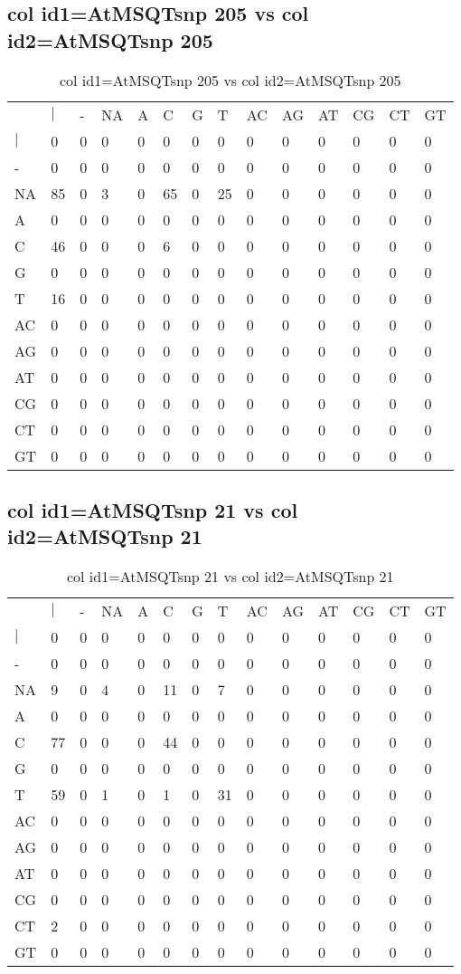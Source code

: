 \subsection{col id1=AtMSQTsnp 205 vs col id2=AtMSQTsnp 205}
\begin{center}
\begin{longtable}{|l|l|l|l|l|l|l|l|l|l|l|l|l|l|}
\caption{col id1=AtMSQTsnp 205 vs col id2=AtMSQTsnp 205} \label{table_dm582}\\
\hline
\\
\hline
&$|$&-&NA&A&C&G&T&AC&AG&AT&CG&CT&GT\\
$|$&0&0&0&0&0&0&0&0&0&0&0&0&0\\
-&0&0&0&0&0&0&0&0&0&0&0&0&0\\
NA&85&0&3&0&65&0&25&0&0&0&0&0&0\\
A&0&0&0&0&0&0&0&0&0&0&0&0&0\\
C&46&0&0&0&6&0&0&0&0&0&0&0&0\\
G&0&0&0&0&0&0&0&0&0&0&0&0&0\\
T&16&0&0&0&0&0&0&0&0&0&0&0&0\\
AC&0&0&0&0&0&0&0&0&0&0&0&0&0\\
AG&0&0&0&0&0&0&0&0&0&0&0&0&0\\
AT&0&0&0&0&0&0&0&0&0&0&0&0&0\\
CG&0&0&0&0&0&0&0&0&0&0&0&0&0\\
CT&0&0&0&0&0&0&0&0&0&0&0&0&0\\
GT&0&0&0&0&0&0&0&0&0&0&0&0&0\\
\hline
\end{longtable}
\end{center}

\subsection{col id1=AtMSQTsnp 21 vs col id2=AtMSQTsnp 21}
\begin{center}
\begin{longtable}{|l|l|l|l|l|l|l|l|l|l|l|l|l|l|}
\caption{col id1=AtMSQTsnp 21 vs col id2=AtMSQTsnp 21} \label{table_dm584}\\
\hline
\\
\hline
&$|$&-&NA&A&C&G&T&AC&AG&AT&CG&CT&GT\\
$|$&0&0&0&0&0&0&0&0&0&0&0&0&0\\
-&0&0&0&0&0&0&0&0&0&0&0&0&0\\
NA&9&0&4&0&11&0&7&0&0&0&0&0&0\\
A&0&0&0&0&0&0&0&0&0&0&0&0&0\\
C&77&0&0&0&44&0&0&0&0&0&0&0&0\\
G&0&0&0&0&0&0&0&0&0&0&0&0&0\\
T&59&0&1&0&1&0&31&0&0&0&0&0&0\\
AC&0&0&0&0&0&0&0&0&0&0&0&0&0\\
AG&0&0&0&0&0&0&0&0&0&0&0&0&0\\
AT&0&0&0&0&0&0&0&0&0&0&0&0&0\\
CG&0&0&0&0&0&0&0&0&0&0&0&0&0\\
CT&2&0&0&0&0&0&0&0&0&0&0&0&0\\
GT&0&0&0&0&0&0&0&0&0&0&0&0&0\\
\hline
\end{longtable}
\end{center}

